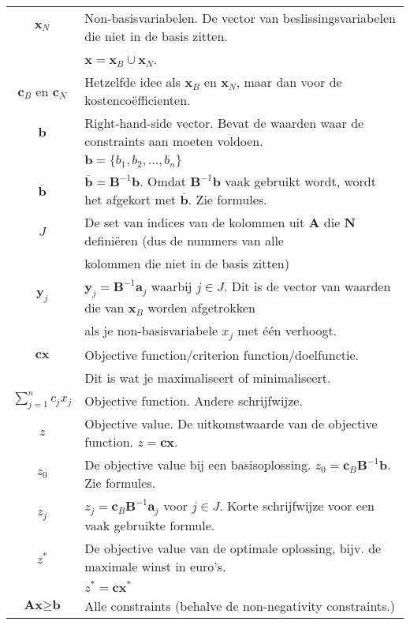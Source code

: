 \documentclass[10pt,a4paper]{article}
\begin{document}
\begin{tabular}{|c|l|}
\hline
$\textbf{x}_N$ & Non-basisvariabelen. De vector van beslissingsvariabelen die niet in de basis zitten. \\
 & $\textbf{x} = \textbf{x}_B \cup \textbf{x}_N$. \\
\hline
$\textbf{c}_B$ en $\textbf{c}_N$ & Hetzelfde idee als $\textbf{x}_B$ en $\textbf{x}_N$, maar dan voor de kostencoëfficienten. \\
\hline
$\textbf{b}$ & Right-hand-side vector. Bevat de waarden waar de constraints aan moeten voldoen.\\
 & $\textbf{b} = \{b_1, b_2, ..., b_n\}$\\
\hline
$\overline{\textbf{b}}$ & $\overline{\textbf{b}} = \textbf{B}^{-1}\textbf{b}$. Omdat $\textbf{B}^{-1}\textbf{b}$ vaak gebruikt wordt, wordt het afgekort met $\overline{\textbf{b}}$. Zie formules. \\
\hline
$J$ & De set van indices van de kolommen uit $\textbf{A}$ die $\textbf{N}$ definiëren (dus de nummers van alle \\
& kolommen die niet in de basis zitten) \\
\hline
$\textbf{y}_j$ & $\textbf{y}_j = \textbf{B}^{-1}\textbf{a}_j$ waarbij $j \in J$. Dit is de vector van waarden die van $\textbf{x}_B$ worden afgetrokken \\ & als je non-basisvariabele $x_j$ met één verhoogt. \\
\hline
$\textbf{cx}$ & Objective function/criterion function/doelfunctie. \\ & 	Dit is wat je maximaliseert of minimaliseert.\\
\hline
$\displaystyle\sum\limits_{j=1}^n c_jx_j$ & Objective function. Andere schrijfwijze. \\
\hline
$z$ & Objective value. De uitkomstwaarde van de objective function. $z = \textbf{cx}$.\\
\hline
$z_0$ & De objective value bij een basisoplossing. $z_0 = \textbf{c}_B\textbf{B}^{-1}\textbf{b}$. Zie formules. \\
\hline
$z_j$ & $z_j = \textbf{c}_B\textbf{B}^{-1}\textbf{a}_j$ voor $j \in J$. Korte schrijfwijze voor een vaak gebruikte formule. \\
\hline
$z^*$ & De objective value van de optimale oplossing, bijv. de maximale winst in euro's. \\ %
 & $z^* = \textbf{cx}^*$ \\
\hline
$\textbf{Ax} \geq \textbf{b}$ & Alle constraints (behalve de non-negativity constraints.)\\

\end{tabular}
\end{document}
